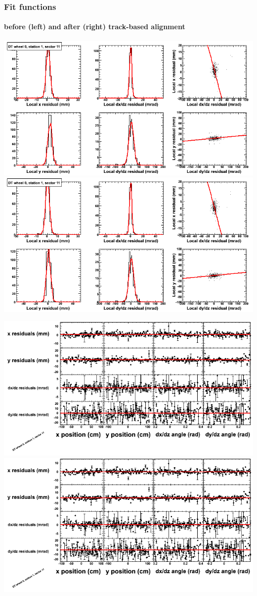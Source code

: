 \documentclass[compress]{beamer}
\begin{document}
\begin{frame}
\frametitle{Fit functions}
\framesubtitle{before (left) and after (right) track-based alignment}
\includegraphics[width=0.5\linewidth]{fitfunctions_re01/MBwhCst1sec11_bellcurves.png} \includegraphics[width=0.5\linewidth]{fitfunctions_re05/MBwhCst1sec11_bellcurves.png}

\includegraphics[width=0.5\linewidth]{fitfunctions_re01/MBwhCst1sec11_polynomials.png} \includegraphics[width=0.5\linewidth]{fitfunctions_re05/MBwhCst1sec11_polynomials.png}
\end{frame}
\end{document}

